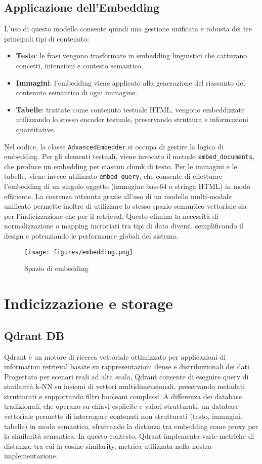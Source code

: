 \subsection{Applicazione dell'Embedding}
L’uso di questo modello consente quindi una gestione unificata e robusta dei tre principali tipi di contenuto:
\begin{itemize}
    \item \textbf{Testo}: le frasi vengono trasformate in embedding linguistici che catturano concetti, intenzioni e contesto semantico.
    \item \textbf{Immagini}: l'embedding viene applicato alla generazione del riassunto del contenuto semantico di ogni immagine.
    \item \textbf{Tabelle}: trattate come contenuto testuale HTML, vengono embeddizzate utilizzando lo stesso encoder testuale, preservando struttura e informazioni quantitative.
\end{itemize}
Nel codice, la classe \verb|AdvancedEmbedder| si occupa di gestire la logica di embedding. Per gli elementi testuali, viene invocato il metodo \verb|embed_documents|, che produce un embedding per ciascun chunk di testo. Per le immagini e le tabelle, viene invece utilizzato \verb|embed_query|, che consente di effettuare l'embedding di un singolo oggetto (immagine base64 o stringa HTML) in modo efficiente.
La coerenza ottenuta grazie all’uso di un modello multi-modale unificato permette inoltre di utilizzare lo stesso spazio semantico vettoriale sia per l’indicizzazione che per il retrieval. Questo elimina la necessità di normalizzazione o mapping incrociati tra tipi di dato diversi, semplificando il design e potenziando le performance globali del sistema.

\begin{figure}[!ht]
\centering
\texttt{[image: figures/embedding.png]}
\caption{Spazio di embedding}
\end{figure}
\section{Indicizzazione e storage}
\subsection{Qdrant DB}
Qdrant è un motore di ricerca vettoriale ottimizzato per applicazioni di information retrieval basate su rappresentazioni dense e distribuzionali dei dati. Progettato per scenari reali ad alta scala, Qdrant consente di eseguire query di similarità k-NN su insiemi di vettori multidimensionali, preservando metadati strutturati e supportando filtri booleani complessi. A differenza dei database tradizionali, che operano su chiavi esplicite e valori strutturati, un database vettoriale permette di interrogare contenuti non strutturati (testo, immagini, tabelle) in modo semantico, sfruttando la distanza tra embedding come proxy per la similarità semantica. In questo contesto, Qdrant implementa varie metriche di distanza, tra cui la cosine similarity, metrica utilizzata nella nostra implementazione. 
